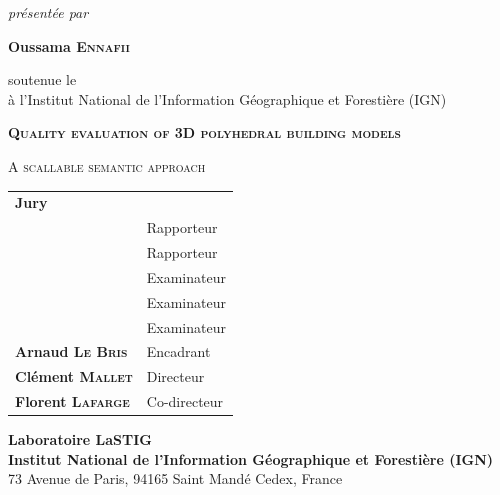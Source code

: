 \begin{titlepage}
\begin{center}
        \textit{présentée par}

        \vspace*{2.5mm}

        \begin{large}
            \textbf{Oussama \textsc{Ennafii}}
        \end{large}

        \vspace*{2.5mm}

        soutenue le  \\
        à l'Institut National de l'Information Géographique et Forestière (IGN)

        \vspace*{5mm}

        \begin{Large}
            \textsc{\textbf{Quality evaluation of 3D polyhedral building models}}\\
        \end{Large}
        \begin{large}
            \textsc{A scallable semantic approach}
        \end{large}

        \vspace*{2cm}

        \begin{tabular}{l l}
            \large \textbf{Jury} & \\
            & Rapporteur \\
            & Rapporteur \\
            & Examinateur \\
            & Examinateur \\
            & Examinateur \\
            \textbf{Arnaud \textsc{Le Bris}} & Encadrant \\
            \textbf{Clément \textsc{Mallet}} & Directeur \\
            \textbf{Florent \textsc{Lafarge}} & Co-directeur \\
        \end{tabular}

        \vfill

        \textbf{Laboratoire LaSTIG}\\
        \textbf{Institut National de l'Information Géographique et Forestière (IGN)} \\
        73 Avenue de Paris, 94165 Saint Mandé Cedex, France
    \end{center}
\end{titlepage}
